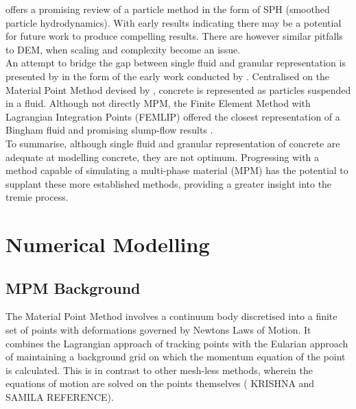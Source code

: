 \newline
\noindent
\citet{ALYHYA17} offers a promising review of a particle method in the form of SPH (smoothed particle hydrodynamics). With early results indicating there may be a potential for future work to produce compelling results. There are however similar pitfalls to DEM, when scaling and complexity become an issue. \\
\newline
\noindent
An attempt to bridge the gap between single fluid and granular representation is presented by \citet{roussel07} in the form of the early work conducted by \citet{moresi03}. Centralised on the Material Point Method devised by \citet{sulsky94}, concrete is represented as particles suspended in a fluid. Although not directly MPM, the Finite Element Method with Lagrangian Integration Points (FEMLIP) offered the closest representation of a Bingham fluid \citep{sofcf} and promising slump-flow results \citep{moresi03,dufour05}.\\
\newline
\noindent
To summarise, although single fluid and granular representation of concrete are adequate at modelling concrete, they are not optimum. Progressing with a method capable of simulating a multi-phase material (MPM) has the potential to supplant these more established methods, providing a greater insight into the tremie process.

\section{Numerical Modelling}
\subsection{MPM Background}
The Material Point Method \citep{sulsky94,sulsky95} involves a continuum body discretised into a finite set of points with deformations governed by Newtons Laws of Motion. It combines the Lagrangian approach of tracking points with the Eularian approach of maintaining a background grid on which the momentum equation of the point is calculated. This is in contrast to other mesh-less methods, wherein the equations of motion are solved on the points themselves ( KRISHNA and SAMILA REFERENCE).
